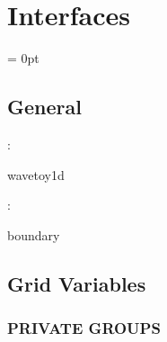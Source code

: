 
\section{Interfaces} 


\parskip = 0pt

\vspace{3mm} \subsection*{General}

: 

wavetoy1d
\vspace{2mm}

: 

boundary
\vspace{2mm}
\subsection*{Grid Variables}
\vspace{5mm}\subsubsection{PRIVATE GROUPS}

\vspace{5mm}


